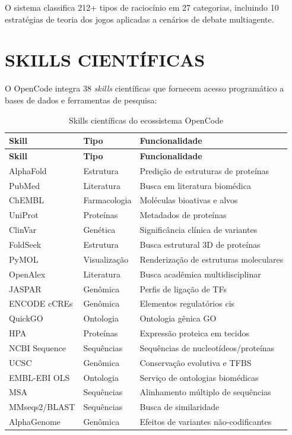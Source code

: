 \documentclass[
  brazil,
  sumario=tradicional,
  10pt
]{abntex2}
\begin{document}
O sistema classifica 212+ tipos de raciocínio em 27 categorias,
incluindo 10 estratégias de teoria dos jogos aplicadas a cenários
de debate multiagente.

\section{SKILLS CIENTÍFICAS}
\label{sec:ciencia}

O OpenCode integra 38 \textit{skills} científicas que fornecem acesso
programático a bases de dados e ferramentas de pesquisa:

\begin{longtable}{p{3.5cm}p{3cm}p{5.5cm}}
  \caption{Skills científicas do ecossistema OpenCode}
  \label{tab:ciencia}\\
  \toprule
  \textbf{Skill} & \textbf{Tipo} & \textbf{Funcionalidade} \\
  \midrule
  \endfirsthead
  \toprule
  \textbf{Skill} & \textbf{Tipo} & \textbf{Funcionalidade} \\
  \midrule
  \endhead
  \bottomrule
  \endfoot
  AlphaFold       & Estrutura      & Predição de estruturas de proteínas \\
  PubMed          & Literatura     & Busca em literatura biomédica \\
  ChEMBL          & Farmacologia   & Moléculas bioativas e alvos \\
  UniProt         & Proteínas      & Metadados de proteínas \\
  ClinVar         & Genética       & Significância clínica de variantes \\
  FoldSeek        & Estrutura      & Busca estrutural 3D de proteínas \\
  PyMOL           & Visualização   & Renderização de estruturas moleculares \\
  OpenAlex        & Literatura     & Busca acadêmica multidisciplinar \\
  JASPAR          & Genômica       & Perfis de ligação de TFs \\
  ENCODE cCREs    & Genômica       & Elementos regulatórios cis \\
  QuickGO         & Ontologia      & Ontologia gênica GO \\
  HPA             & Proteínas      & Expressão proteica em tecidos \\
  NCBI Sequence   & Sequências     & Sequências de nucleotídeos/proteínas \\
  UCSC            & Genômica       & Conservação evolutiva e TFBS \\
  EMBL-EBI OLS    & Ontologia      & Serviço de ontologias biomédicas \\
  MSA             & Sequências     & Alinhamento múltiplo de sequências \\
  MMseqs2/BLAST   & Sequências     & Busca de similaridade \\
  AlphaGenome     & Genômica       & Efeitos de variantes não-codificantes \\
\end{longtable}
\end{document}

